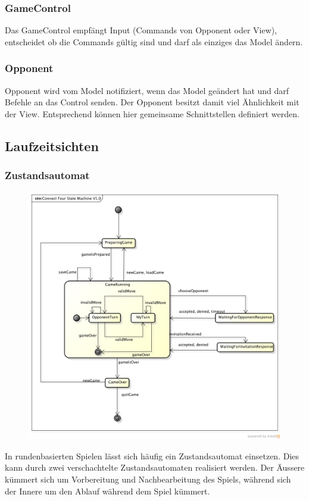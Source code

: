 \documentclass[a4paper, 10pt, fleqn]{article}
\begin{document}
\subsubsection{GameControl}
Das GameControl empfängt Input (Commands von Opponent oder View), entscheidet 
ob die Commands gültig sind und darf als einziges das Model ändern.

\subsubsection{Opponent}
Opponent wird vom Model notifiziert, wenn das Model geändert hat und darf 
Befehle an das Control senden. Der Opponent besitzt damit viel Ähnlichkeit 
mit der View. Entsprechend können hier gemeinsame Schnittstellen definiert 
werden.

\subsection{Laufzeitsichten}

\subsubsection{Zustandsautomat}
\begin{figure}[h!]
    \center
    \includegraphics[width=\textwidth]{fig/state.png}
\end{figure}
In rundenbasierten Spielen lässt sich häufig ein Zustandsautomat einsetzen. 
Dies kann durch zwei verschachtelte Zustandsautomaten realisiert werden. Der 
Äussere kümmert sich um Vorbereitung und Nachbearbeitung des Spiels, während 
sich der Innere um den Ablauf während dem Spiel kümmert.
\end{document}
